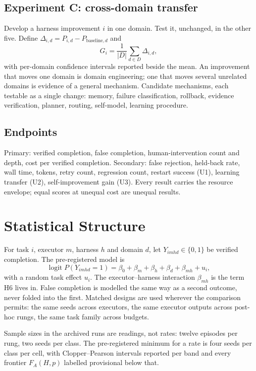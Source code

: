 \subsection{Experiment C: cross-domain transfer}

Develop a harness improvement $i$ in one domain. Test it, unchanged, in the other five. Define $\Delta_{i,d} = P_{i,d} - P_{\text{baseline},d}$ and
\[
G_i = \frac{1}{|D|}\sum_{d \in D} \Delta_{i,d},
\]
with per-domain confidence intervals reported beside the mean. An improvement that moves one domain is domain engineering; one that moves several unrelated domains is evidence of a general mechanism. Candidate mechanisms, each testable as a single change: memory, failure classification, rollback, evidence verification, planner, routing, self-model, learning procedure.

\subsection{Endpoints}

Primary: verified completion, false completion, human-intervention count and depth, cost per verified completion. Secondary: false rejection, held-back rate, wall time, tokens, retry count, regression count, restart success (U1), learning transfer (U2), self-improvement gain (U3). Every result carries the resource envelope; equal scores at unequal cost are unequal results.

\section{Statistical Structure}\label{sec:stats}

For task $i$, executor $m$, harness $h$ and domain $d$, let $Y_{imhd} \in \{0,1\}$ be verified completion. The pre-registered model is
\[
\operatorname{logit} P(Y_{imhd} = 1) = \beta_0 + \beta_m + \beta_h + \beta_d + \beta_{mh} + u_i,
\]
with a random task effect $u_i$. The executor--harness interaction $\beta_{mh}$ is the term H6 lives in. False completion is modelled the same way as a second outcome, never folded into the first. Matched designs are used wherever the comparison permits: the same seeds across executors, the same executor outputs across post-hoc rungs, the same task family across budgets.

Sample sizes in the archived runs are readings, not rates: twelve episodes per rung, two seeds per class. The pre-registered minimum for a rate is four seeds per class per cell, with Clopper--Pearson intervals reported per band and every frontier $F_A(H,p)$ labelled provisional below that.

